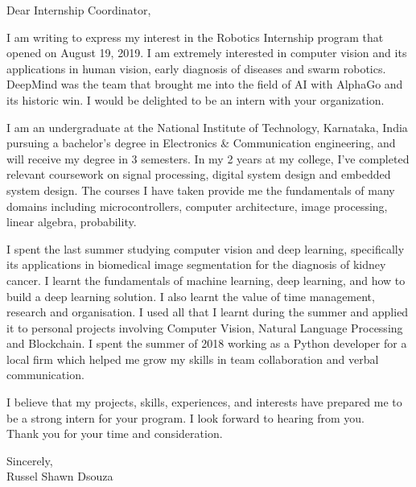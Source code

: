 \documentclass[11pt,a4paper,sans]{moderncv}
\begin{document}
  \date{August 23, 2019}
  \opening{Dear Internship Coordinator,}
  \makelettertitle

  I am writing to express my interest in the Robotics Internship program that opened on August 19, 2019. 
  I am extremely interested in computer vision and its applications in human vision, early diagnosis of diseases and swarm robotics. 
  DeepMind was the team that brought me into the field of AI with AlphaGo and its historic win. 
  I would be delighted to be an intern with your organization.

  I am an undergraduate at the National Institute of Technology, Karnataka, India pursuing a bachelor's degree in Electronics \& Communication
  engineering, and will receive my degree in 3 semesters. 
  In my 2 years at my college, I've completed relevant coursework on signal processing, digital system design and embedded system design. 
  The courses I have taken provide me the fundamentals of many domains including microcontrollers, computer architecture, image processing, linear algebra, probability.

  I spent the last summer studying computer vision and deep learning, specifically its applications in biomedical image segmentation for the diagnosis of kidney cancer. I learnt the fundamentals of machine learning, deep learning, and how to build a deep learning solution. 
  I also learnt the value of time management, research and organisation. 
  I used all that I learnt during the summer and applied it to personal projects involving Computer Vision, Natural Language Processing and Blockchain. 
  I spent the summer of 2018 working as a Python developer for a local firm which helped me grow my skills in team collaboration and verbal communication.

  I believe that my projects, skills, experiences, and interests have prepared me to be a strong intern for your program. 
  I look forward to hearing from you.\\
  Thank you for your time and consideration.

  Sincerely,\\
  Russel Shawn Dsouza
\end{document}
